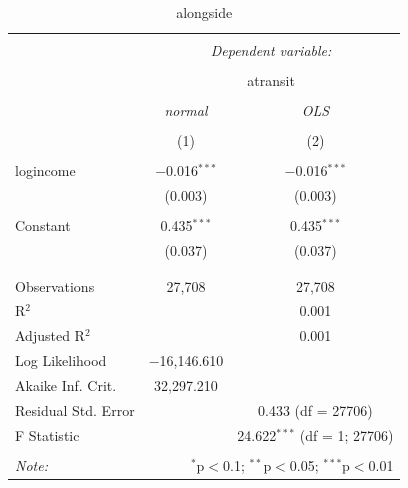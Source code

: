 \documentclass[10pt,a4paper]{article}
\begin{document}
\begin{table}[!htbp] \centering 
  \caption{alongside} 
  \label{} 
\begin{tabular}{@{\extracolsep{5pt}}lcc} 
\\[-1.8ex]\hline 
\hline \\[-1.8ex] 
 & \multicolumn{2}{c}{\textit{Dependent variable:}} \\ 
\cline{2-3} 
\\[-1.8ex] & \multicolumn{2}{c}{atransit} \\ 
\\[-1.8ex] & \textit{normal} & \textit{OLS} \\ 
\\[-1.8ex] & (1) & (2)\\ 
\hline \\[-1.8ex] 
 logincome & $-$0.016$^{***}$ & $-$0.016$^{***}$ \\ 
  & (0.003) & (0.003) \\ 
  & & \\ 
 Constant & 0.435$^{***}$ & 0.435$^{***}$ \\ 
  & (0.037) & (0.037) \\ 
  & & \\ 
\hline \\[-1.8ex] 
Observations & 27,708 & 27,708 \\ 
R$^{2}$ &  & 0.001 \\ 
Adjusted R$^{2}$ &  & 0.001 \\ 
Log Likelihood & $-$16,146.610 &  \\ 
Akaike Inf. Crit. & 32,297.210 &  \\ 
Residual Std. Error &  & 0.433 (df = 27706) \\ 
F Statistic &  & 24.622$^{***}$ (df = 1; 27706) \\ 
\hline 
\hline \\[-1.8ex] 
\textit{Note:}  & \multicolumn{2}{r}{$^{*}$p$<$0.1; $^{**}$p$<$0.05; $^{***}$p$<$0.01} \\ 
\end{tabular} 
\end{table} 
\end{document}
